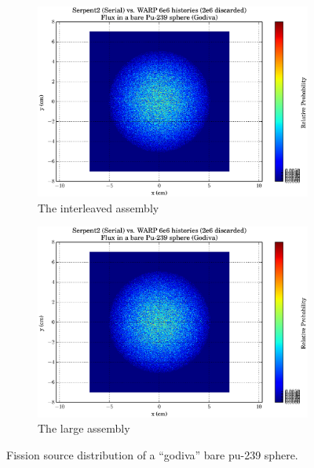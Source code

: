 \begin{figure}[h!]
\centering
\begin{subfigure}{.5\textwidth}
  \centering
  \includegraphics[width=\linewidth]{graphics/finalresults/godiva_fiss1.eps}
  \caption{The interleaved assembly}
  \label{fig:sub1}
\end{subfigure}%
\begin{subfigure}{.5\textwidth}
  \centering
  \includegraphics[width=\linewidth]{graphics/finalresults/godiva_fiss2.eps}
  \caption{The large assembly}
  \label{fig:sub2}
\end{subfigure}
\caption{Fission source distribution of a ``godiva'' bare pu-239 sphere. \label{godiva_fiss} }
\end{figure}

